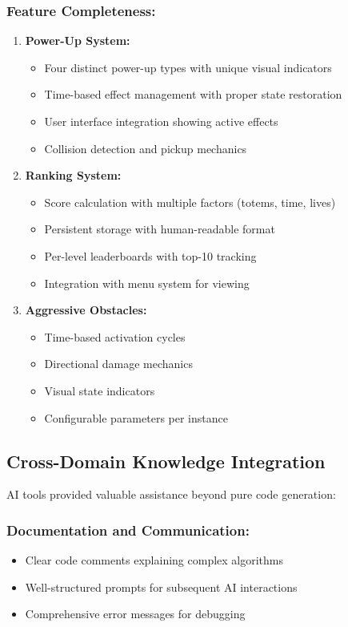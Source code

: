 \documentclass[12pt,a4paper]{article}
\begin{document}
\subsubsection*{Feature Completeness:}
\begin{enumerate}
    \item \textbf{Power-Up System:}
    \begin{itemize}
        \item Four distinct power-up types with unique visual indicators
        \item Time-based effect management with proper state restoration
        \item User interface integration showing active effects
        \item Collision detection and pickup mechanics
    \end{itemize}
    
    \item \textbf{Ranking System:}
    \begin{itemize}
        \item Score calculation with multiple factors (totems, time, lives)
        \item Persistent storage with human-readable format
        \item Per-level leaderboards with top-10 tracking
        \item Integration with menu system for viewing
    \end{itemize}
    
    \item \textbf{Aggressive Obstacles:}
    \begin{itemize}
        \item Time-based activation cycles
        \item Directional damage mechanics
        \item Visual state indicators
        \item Configurable parameters per instance
    \end{itemize}
\end{enumerate}

\subsection{Cross-Domain Knowledge Integration}

AI tools provided valuable assistance beyond pure code generation:

\subsubsection*{Documentation and Communication:}
\begin{itemize}
    \item Clear code comments explaining complex algorithms
    \item Well-structured prompts for subsequent AI interactions
    \item Comprehensive error messages for debugging
\end{itemize}
\end{document}
